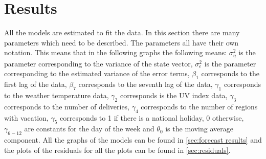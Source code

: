\section{Results}

\label{subseq:model estimation}
All the models are estimated to fit the data. In this section there are many parameters which need to be described. The parameters all have their own notation. This means that in the following graphs the following means: $\sigma_{\eta}^2$ is the parameter corresponding to the variance of the state vector, $\sigma_{\epsilon}^2$ is the parameter corresponding to the estimated variance of the error terms, $\beta_1$ corresponds to the first lag of the data, $\beta_7$ corresponds to the seventh lag of the data, $\gamma_1$ corresponds to the weather temperature data, $\gamma_2$ corresponds is the UV index data, $\gamma_3$ corresponds to the number of deliveries, $\gamma_4$ corresponds to the number of regions with vacation, $\gamma_5$ corresponds to 1 if there is a national holiday, 0 otherwise, $\gamma_{6-12}$  are constants for the day of the week and $\theta_0$ is the moving average component. All the graphs of the models can be found in \autoref{sec:forecast results} and the plots of the residuals for all the plots can be found in \autoref{sec:residuals}.\\

